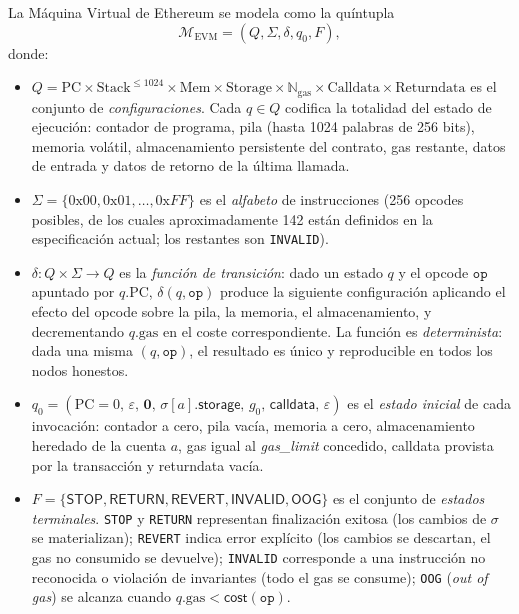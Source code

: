 \begin{definicion}
\label{def:evm_fsm}
La Máquina Virtual de Ethereum se modela como la quíntupla
\begin{equation}
  \mathcal{M}_{\text{EVM}} = (Q, \Sigma, \delta, q_0, F),
  \label{eq:evm_dfa}
\end{equation}
donde:
\begin{itemize}
  \item $Q = \text{PC} \times \text{Stack}^{\leq 1024} \times \text{Mem} \times \text{Storage} \times \mathbb{N}_{\text{gas}} \times \text{Calldata} \times \text{Returndata}$ es el conjunto de \emph{configuraciones}. Cada $q \in Q$ codifica la totalidad del estado de ejecución: contador de programa, pila (hasta 1024 palabras de 256 bits), memoria volátil, almacenamiento persistente del contrato, gas restante, datos de entrada y datos de retorno de la última llamada.
  \item $\Sigma = \{0\text{x}00, 0\text{x}01, \ldots, 0\text{x}FF\}$ es el \emph{alfabeto} de instrucciones (256 opcodes posibles, de los cuales aproximadamente 142 están definidos en la especificación actual; los restantes son \texttt{INVALID}).
  \item $\delta : Q \times \Sigma \to Q$ es la \emph{función de transición}: dado un estado $q$ y el opcode $\texttt{op}$ apuntado por $q.\text{PC}$, $\delta(q, \texttt{op})$ produce la siguiente configuración aplicando el efecto del opcode sobre la pila, la memoria, el almacenamiento, y decrementando $q.\text{gas}$ en el coste correspondiente. La función es \emph{determinista}: dada una misma $(q, \texttt{op})$, el resultado es único y reproducible en todos los nodos honestos.
  \item $q_0 = (\text{PC}=0,\, \varepsilon,\, \mathbf{0},\, \sigma[a].\textsf{storage},\, g_0,\, \textsf{calldata},\, \varepsilon)$ es el \emph{estado inicial} de cada invocación: contador a cero, pila vacía, memoria a cero, almacenamiento heredado de la cuenta $a$, gas igual al \emph{gas\_limit} concedido, calldata provista por la transacción y returndata vacía.
  \item $F = \{\textsf{STOP}, \textsf{RETURN}, \textsf{REVERT}, \textsf{INVALID}, \textsf{OOG}\}$ es el conjunto de \emph{estados terminales}. \texttt{STOP} y \texttt{RETURN} representan finalización exitosa (los cambios de $\sigma$ se materializan); \texttt{REVERT} indica error explícito (los cambios se descartan, el gas no consumido se devuelve); \texttt{INVALID} corresponde a una instrucción no reconocida o violación de invariantes (todo el gas se consume); \texttt{OOG} (\emph{out of gas}) se alcanza cuando $q.\text{gas} < \textsf{cost}(\texttt{op})$.
\end{itemize}
\end{definicion}

